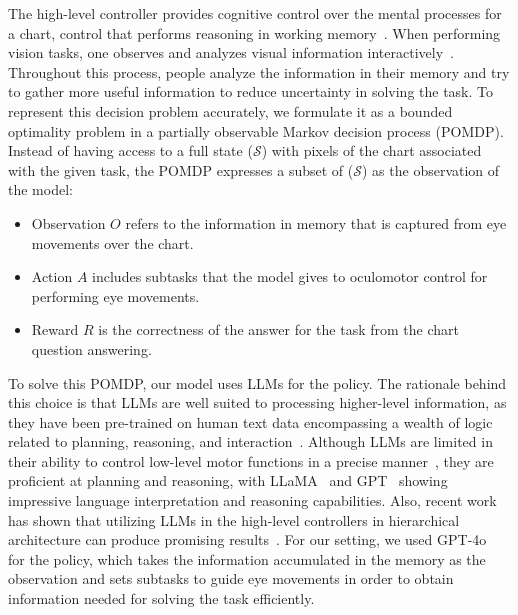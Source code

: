 The high-level controller provides cognitive control over the mental processes for a chart, control that performs reasoning in working memory~\cite{liu2010mental}. When performing vision tasks, one observes and analyzes visual information interactively~\cite{chen2020air}. Throughout this process, people analyze the information in their memory and try to gather more useful information to reduce uncertainty in solving the task.
To represent this decision problem accurately, we formulate it as a bounded optimality problem in a partially observable Markov decision process (POMDP). Instead of having access to a full state ($\mathcal{S}$) with pixels of the chart associated with the given task, the POMDP expresses a subset of ($\mathcal{S}$) as the observation of the model:
\begin{itemize}
    \item Observation $O$ refers to the information in memory that is captured from eye movements over the chart.
    \item Action $A$ includes subtasks that the model gives to oculomotor control for performing eye movements.
    \item Reward $R$ is the correctness of the answer for the task from the chart question answering.
\end{itemize}
To solve this POMDP, our model uses LLMs for the policy. The rationale behind this choice is that LLMs are well suited to processing higher-level information, as they have been pre-trained on human text data encompassing a wealth of logic related to planning, reasoning, and interaction~\cite{huang2022language, vemprala2024chatgpt, li2023interactive}.
Although LLMs are limited in their ability to control low-level motor functions in a precise manner~\cite{dalal2024psl}, they are proficient at planning and reasoning, with LLaMA~\cite{touvron2023llama} and GPT~\cite{achiam2023gpt} showing impressive language interpretation and reasoning capabilities.
Also, recent work has shown that utilizing LLMs in the high-level controllers in hierarchical architecture can produce promising results~\cite{huang2022language, brohan2023can, liang2023code}.
For our setting, we used GPT-4o~\cite{achiam2023gpt} for the policy, which takes the information accumulated in the memory as the observation and sets subtasks to guide eye movements in order to obtain information needed for solving the task efficiently.

